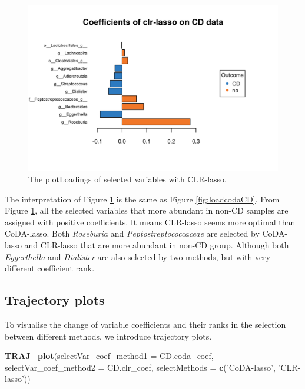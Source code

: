 \documentclass[openany]{book}
\newenvironment{Shaded}{\begin{snugshade}}{\end{snugshade}}
\newcommand{\KeywordTok}[1]{\textcolor[rgb]{0.13,0.29,0.53}{\textbf{#1}}}
\newcommand{\DataTypeTok}[1]{\textcolor[rgb]{0.13,0.29,0.53}{#1}}
\newcommand{\StringTok}[1]{\textcolor[rgb]{0.31,0.60,0.02}{#1}}
\newcommand{\NormalTok}[1]{#1}
\begin{document}
\begin{figure}

{\centering \includegraphics[width=1\linewidth]{./Generated_plots/loadclrCD-1} 

}

\caption{The plotLoadings of selected variables with CLR-lasso.}\label{fig:loadclrCD}
\end{figure}

The interpretation of Figure \ref{fig:loadclrCD} is the same as Figure
\ref{fig:loadcodaCD}. From Figure \ref{fig:loadclrCD}, all the selected
variables that more abundant in non-CD samples are assigned with
positive coefficients. It means CLR-lasso seems more optimal than
CoDA-lasso. Both \emph{Roseburia} and \emph{Peptostreptococcaceae} are
selected by CoDA-lasso and CLR-lasso that are more abundant in non-CD
group. Although both \emph{Eggerthella} and \emph{Dialister} are also
selected by two methods, but with very different coefficient rank.

\subsection{Trajectory plots}\label{trajectory-plots}

To visualise the change of variable coefficients and their ranks in the
selection between different methods, we introduce trajectory plots.

\begin{Shaded}
\begin{Highlighting}[]
\KeywordTok{TRAJ_plot}\NormalTok{(}\DataTypeTok{selectVar_coef_method1 =}\NormalTok{ CD.coda_coef, }\DataTypeTok{selectVar_coef_method2 =}\NormalTok{ CD.clr_coef, }
          \DataTypeTok{selectMethods =} \KeywordTok{c}\NormalTok{(}\StringTok{'CoDA-lasso'}\NormalTok{, }\StringTok{'CLR-lasso'}\NormalTok{))}
\end{Highlighting}
\end{Shaded}
\end{document}
